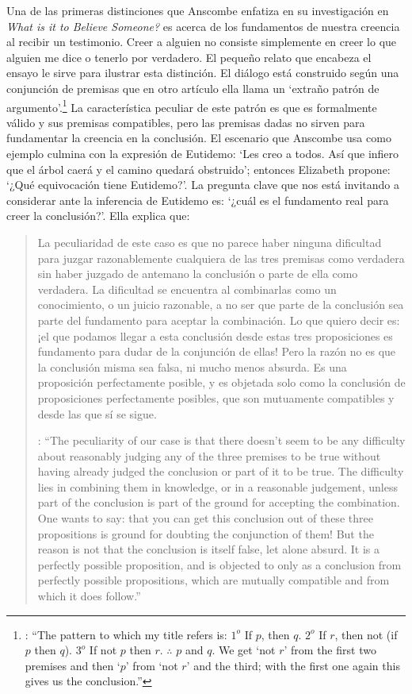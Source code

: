 Una de las primeras distinciones que Anscombe enfatiza en su investigación en \emph{What is it to Believe Someone?} es acerca de los fundamentos de nuestra creencia al recibir un testimonio. Creer a alguien no consiste simplemente en creer lo que alguien me dice o tenerlo por verdadero. El pequeño relato que encabeza el ensayo le sirve para ilustrar esta distinción. El diálogo está construido según una conjunción de premisas que en otro artículo ella llama un `extraño patrón de argumento'.\footnote{\cite[Cf.~][299]{anscombe2015logic:qpa}: \enquote{The pattern to which my title refers is: $1^{o}$ If $p$, then $q$. $2^{o}$ If $r$, then not (if $p$ then $q$). $3^{o}$ If not $p$ then $r$. $\mathbf{\therefore}$ $p$ and $q$. We get `not $r$' from the first two premises and then `$p$' from `not $r$' and the third; with the first one again this gives us the conclusion.}} La característica peculiar de este patrón es que es formalmente válido y sus premisas compatibles, pero las premisas dadas no sirven para fundamentar la creencia en la conclusión. El escenario que Anscombe usa como ejemplo culmina con la expresión de Eutidemo: \enquote*{Les creo a todos. Así que infiero que el árbol caerá y el camino quedará obstruido}; entonces Elizabeth propone: \enquote*{¿Qué equivocación tiene Eutidemo?}. La pregunta clave que nos está invitando a considerar ante la inferencia de Eutidemo es: \enquote*{¿cuál es el fundamento real para creer la conclusión?}. Ella explica que: \blockquote[{\cite[301]{anscombe2015logic:qpa}}: \enquote{The peculiarity of our case is that there doesn't seem to be any difficulty about reasonably judging any of the three premises to be true without having already judged the conclusion or part of it to be true. The difficulty lies in combining them in knowledge, or in a reasonable judgement, unless part of the conclusion is part of the ground for accepting the combination. One wants to say: that you can get this conclusion out of these three propositions is ground for doubting the conjunction of them! But the reason is not that the conclusion is itself false, let alone absurd. It is a perfectly possible proposition, and is objected to only as a conclusion from perfectly possible propositions, which are mutually compatible and from which it does follow.}]{La peculiaridad de este caso es que no parece haber ninguna dificultad para juzgar razonablemente cualquiera de las tres premisas como verdadera sin haber juzgado de antemano la conclusión o parte de ella como verdadera. La dificultad se encuentra al combinarlas como un conocimiento, o un juicio razonable, a no ser que parte de la conclusión sea parte del fundamento para aceptar la combinación. Lo que quiero decir es: ¡el que podamos llegar a esta conclusión desde estas tres proposiciones es fundamento para dudar de la conjunción de ellas! Pero la razón no es que la conclusión misma sea falsa, ni mucho menos absurda. Es una proposición perfectamente posible, y es objetada solo como la conclusión de proposiciones perfectamente posibles, que son mutuamente compatibles y desde las que sí se sigue.}

